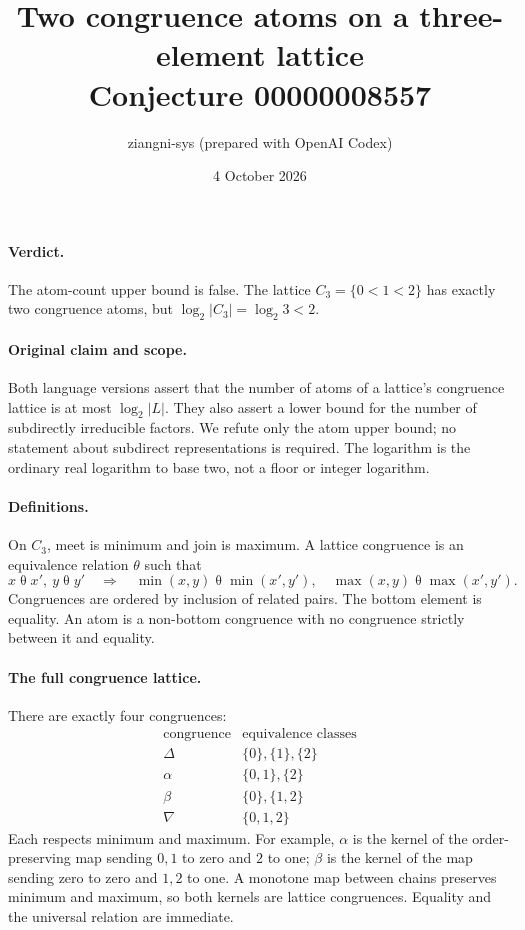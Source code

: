 \documentclass[11pt]{article}
\title{Two congruence atoms on a three-element lattice\\Conjecture 00000008557}
\author{ziangni-sys (prepared with OpenAI Codex)}
\date{4 October 2026}
\begin{document}
\maketitle
\paragraph{Verdict.} The atom-count upper bound is false. The lattice $C_3=\{0<1<2\}$ has exactly two congruence atoms, but $\log_2|C_3|=\log_2 3<2$.

\paragraph{Original claim and scope.} Both language versions assert that the number of atoms of a lattice's congruence lattice is at most $\log_2|L|$. They also assert a lower bound for the number of subdirectly irreducible factors. We refute only the atom upper bound; no statement about subdirect representations is required. The logarithm is the ordinary real logarithm to base two, not a floor or integer logarithm.

\paragraph{Definitions.} On $C_3$, meet is minimum and join is maximum. A lattice congruence is an equivalence relation $\theta$ such that
\[
x\mathrel\theta x',\ y\mathrel\theta y'
\quad\Longrightarrow\quad
\min(x,y)\mathrel\theta\min(x',y'),\quad
\max(x,y)\mathrel\theta\max(x',y').
\]
Congruences are ordered by inclusion of related pairs. The bottom element is equality. An atom is a non-bottom congruence with no congruence strictly between it and equality.

\paragraph{The full congruence lattice.} There are exactly four congruences:
\[
\begin{array}{c|c}
\text{congruence}&\text{equivalence classes}\\\hline
\Delta&\{0\},\{1\},\{2\}\\
\alpha&\{0,1\},\{2\}\\
\beta&\{0\},\{1,2\}\\
\nabla&\{0,1,2\}
\end{array}
\]
Each respects minimum and maximum. For example, $\alpha$ is the kernel of the order-preserving map sending $0,1$ to zero and $2$ to one; $\beta$ is the kernel of the map sending zero to zero and $1,2$ to one. A monotone map between chains preserves minimum and maximum, so both kernels are lattice congruences. Equality and the universal relation are immediate.
\end{document}
